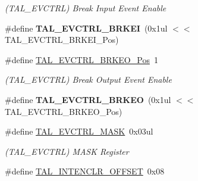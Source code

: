 \begin{DoxyCompactItemize}
\begin{DoxyCompactList}\small\item\em (T\+A\+L\+\_\+\+E\+V\+C\+T\+R\+L) Break Input Event Enable \end{DoxyCompactList}\item 
\hypertarget{group___s_a_m_l21___t_a_l_ga9edfa5b58a4e5fb87c08f36ff2d892b5}{}\#define {\bfseries T\+A\+L\+\_\+\+E\+V\+C\+T\+R\+L\+\_\+\+B\+R\+K\+E\+I}~(0x1ul $<$$<$ T\+A\+L\+\_\+\+E\+V\+C\+T\+R\+L\+\_\+\+B\+R\+K\+E\+I\+\_\+\+Pos)\label{group___s_a_m_l21___t_a_l_ga9edfa5b58a4e5fb87c08f36ff2d892b5}

\item 
\hypertarget{group___s_a_m_l21___t_a_l_gaf566a24c3b20e70768aa0522b362adc2}{}\#define \hyperlink{group___s_a_m_l21___t_a_l_gaf566a24c3b20e70768aa0522b362adc2}{T\+A\+L\+\_\+\+E\+V\+C\+T\+R\+L\+\_\+\+B\+R\+K\+E\+O\+\_\+\+Pos}~1\label{group___s_a_m_l21___t_a_l_gaf566a24c3b20e70768aa0522b362adc2}

\begin{DoxyCompactList}\small\item\em (T\+A\+L\+\_\+\+E\+V\+C\+T\+R\+L) Break Output Event Enable \end{DoxyCompactList}\item 
\hypertarget{group___s_a_m_l21___t_a_l_ga893caebee59e6ce0b44dd574f416903a}{}\#define {\bfseries T\+A\+L\+\_\+\+E\+V\+C\+T\+R\+L\+\_\+\+B\+R\+K\+E\+O}~(0x1ul $<$$<$ T\+A\+L\+\_\+\+E\+V\+C\+T\+R\+L\+\_\+\+B\+R\+K\+E\+O\+\_\+\+Pos)\label{group___s_a_m_l21___t_a_l_ga893caebee59e6ce0b44dd574f416903a}

\item 
\hypertarget{group___s_a_m_l21___t_a_l_ga410db4f690c9353483a0910ce228d810}{}\#define \hyperlink{group___s_a_m_l21___t_a_l_ga410db4f690c9353483a0910ce228d810}{T\+A\+L\+\_\+\+E\+V\+C\+T\+R\+L\+\_\+\+M\+A\+S\+K}~0x03ul\label{group___s_a_m_l21___t_a_l_ga410db4f690c9353483a0910ce228d810}

\begin{DoxyCompactList}\small\item\em (T\+A\+L\+\_\+\+E\+V\+C\+T\+R\+L) M\+A\+S\+K Register \end{DoxyCompactList}\item 
\hypertarget{group___s_a_m_l21___t_a_l_ga5dde4bd79f7f604fc12b1d8a47caf852}{}\#define \hyperlink{group___s_a_m_l21___t_a_l_ga5dde4bd79f7f604fc12b1d8a47caf852}{T\+A\+L\+\_\+\+I\+N\+T\+E\+N\+C\+L\+R\+\_\+\+O\+F\+F\+S\+E\+T}~0x08\label{group___s_a_m_l21___t_a_l_ga5dde4bd79f7f604fc12b1d8a47caf852}


\end{DoxyCompactItemize}
